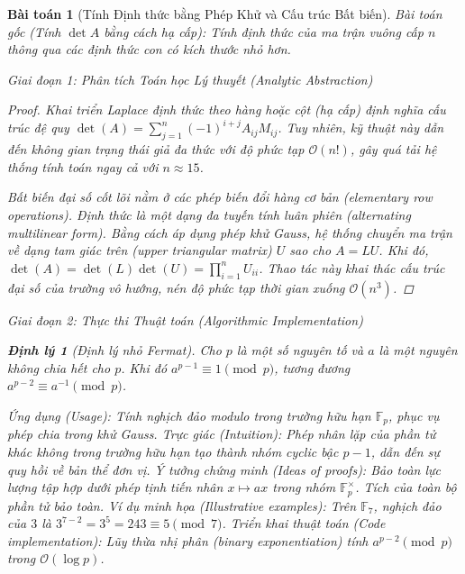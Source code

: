 \documentclass{article}
\newtheorem{baitoan}{Bài toán}
\newtheorem{dinhly}{Định lý}
\begin{document}
\begin{baitoan}[Tính Định thức bằng Phép Khử và Cấu trúc Bất biến]
 \emph{Bài toán gốc (Tính $\det A$ bằng cách hạ cấp):} Tính định thức của ma trận vuông cấp $n$ thông qua các định thức con có kích thước nhỏ hơn.
 
\vspace{0.5em}\noindent\emph{Giai đoạn 1: Phân tích Toán học Lý thuyết (Analytic Abstraction)}
 
\begin{proof}
 Khai triển Laplace định thức theo hàng hoặc cột (hạ cấp) định nghĩa cấu trúc đệ quy $\det(A) = \sum_{j=1}^n (-1)^{i+j} A_{ij} M_{ij}$. Tuy nhiên, kỹ thuật này dẫn đến không gian trạng thái giả đa thức với độ phức tạp $\mathcal{O}(n!)$, gây quá tải hệ thống tính toán ngay cả với $n \approx 15$. 
 
 Bất biến đại số cốt lõi nằm ở các phép biến đổi hàng cơ bản (elementary row operations). Định thức là một dạng đa tuyến tính luân phiên (alternating multilinear form). Bằng cách áp dụng phép khử Gauss, hệ thống chuyển ma trận về dạng tam giác trên (upper triangular matrix) $U$ sao cho $A = LU$. Khi đó, $\det(A) = \det(L)\det(U) = \prod_{i=1}^n U_{ii}$. Thao tác này khai thác cấu trúc đại số của trường vô hướng, nén độ phức tạp thời gian xuống $\mathcal{O}(n^3)$.
 \end{proof}

\vspace{0.5em}\noindent\emph{Giai đoạn 2: Thực thi Thuật toán (Algorithmic Implementation)}
 
\begin{dinhly}[Định lý nhỏ Fermat]\label{thm:fermat_little}
Cho $p$ là một số nguyên tố và $a$ là một nguyên không chia hết cho $p$. Khi đó $a^{p-1} \equiv 1 \pmod p$, tương đương $a^{p-2} \equiv a^{-1} \pmod p$.
\end{dinhly}
\emph{Ứng dụng (Usage):} Tính nghịch đảo modulo trong trường hữu hạn $\mathbb{F}_p$, phục vụ phép chia trong khử Gauss.
\emph{Trực giác (Intuition):} Phép nhân lặp của phần tử khác không trong trường hữu hạn tạo thành nhóm cyclic bậc $p-1$, dẫn đến sự quy hồi về bản thể đơn vị.
\emph{Ý tưởng chứng minh (Ideas of proofs):} Bảo toàn lực lượng tập hợp dưới phép tịnh tiến nhân $x \mapsto ax$ trong nhóm $\mathbb{F}_p^\times$. Tích của toàn bộ phần tử bảo toàn.
\emph{Ví dụ minh họa (Illustrative examples):} Trên $\mathbb{F}_7$, nghịch đảo của $3$ là $3^{7-2} = 3^5 = 243 \equiv 5 \pmod 7$.
\emph{Triển khai thuật toán (Code implementation):} Lũy thừa nhị phân (binary exponentiation) tính $a^{p-2} \pmod p$ trong $\mathcal{O}(\log p)$.


\end{baitoan}
\end{document}
